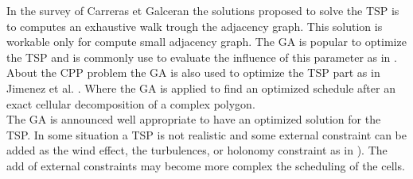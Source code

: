 	In the survey of Carreras et Galceran \citep{66*galceran2013} the solutions proposed to solve the TSP is to computes an exhaustive walk trough the adjacency graph. This solution is workable only for compute small adjacency graph. The GA is popular to optimize the TSP and is commonly use to evaluate the influence of this parameter as in \citep{68*muhlenbein1989} \citep{80*serpell2010}. About the CPP problem the GA is also used to optimize the TSP part as in Jimenez et al. \citep{217*jimenez2007}. Where the GA is applied to find an optimized schedule after an exact cellular decomposition of a complex polygon. \\
The GA is announced well appropriate to have an optimized solution for the TSP. 
In some situation a  TSP is not realistic and some external constraint can be added as the wind effect, the turbulences, or holonomy constraint as in \citep{56*davies2006,102*ware2016,66*galceran2013}). The add of external constraints may become more complex the scheduling  of the cells. 
 
 


 



